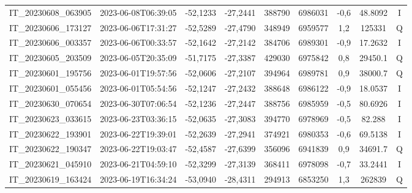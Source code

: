 \begin{table}[htb!]
\begin{tabular}{ccccS[table-format=6.0]S[table-format=7.0]ccc}
            IT\_20230608\_063905 & 2023-06-08T06:39:05 & -52,1233 & -27,2441 & 388790 & 6986031 & -0,6 & \num[round-precision=3,round-mode=figures,scientific-notation=true]{48.8092} & I \\
            IT\_20230606\_173127 & 2023-06-06T17:31:27 & -52,5289 & -27,4790 & 348949 & 6959577 & 1,2 & \num[round-precision=3,round-mode=figures,scientific-notation=true]{125331} & Q \\
            IT\_20230606\_003357 & 2023-06-06T00:33:57 & -52,1642 & -27,2142 & 384706 & 6989301 & -0,9 & \num[round-precision=3,round-mode=figures,scientific-notation=true]{17.2632} & I \\
            IT\_20230605\_203509 & 2023-06-05T20:35:09 & -51,7175 & -27,3387 & 429030 & 6975842 & 0,8 & \num[round-precision=3,round-mode=figures,scientific-notation=true]{29450.1} & Q \\
            IT\_20230601\_195756 & 2023-06-01T19:57:56 & -52,0606 & -27,2107 & 394964 & 6989781 & 0,9 & \num[round-precision=3,round-mode=figures,scientific-notation=true]{38000.7} & Q \\
            IT\_20230601\_055456 & 2023-06-01T05:54:56 & -52,1247 & -27,2432 & 388648 & 6986122 & -0,9 & \num[round-precision=3,round-mode=figures,scientific-notation=true]{18.0537} & I \\
            IT\_20230630\_070654 & 2023-06-30T07:06:54 & -52,1236 & -27,2447 & 388756 & 6985959 & -0,5 & \num[round-precision=3,round-mode=figures,scientific-notation=true]{80.6926} & I \\
            IT\_20230623\_033615 & 2023-06-23T03:36:15 & -52,0635 & -27,3083 & 394770 & 6978969 & -0,5 & \num[round-precision=3,round-mode=figures,scientific-notation=true]{82.288} & I \\
            IT\_20230622\_193901 & 2023-06-22T19:39:01 & -52,2639 & -27,2941 & 374921 & 6980353 & -0,6 & \num[round-precision=3,round-mode=figures,scientific-notation=true]{69.5138} & I \\
            IT\_20230622\_190347 & 2023-06-22T19:03:47 & -52,4587 & -27,6399 & 356096 & 6941839 & 0,9 & \num[round-precision=3,round-mode=figures,scientific-notation=true]{34691.7} & Q \\
            IT\_20230621\_045910 & 2023-06-21T04:59:10 & -52,3299 & -27,3139 & 368411 & 6978098 & -0,7 & \num[round-precision=3,round-mode=figures,scientific-notation=true]{33.2441} & I \\
            IT\_20230619\_163424 & 2023-06-19T16:34:24 & -53,0940 & -28,4311 & 294913 & 6853250 & 1,3 & \num[round-precision=3,round-mode=figures,scientific-notation=true]{262839} & Q \\

\end{tabular}
\end{table}

